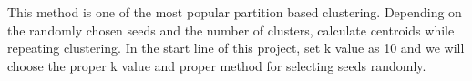 This method is one of the most popular partition based clustering. Depending on the randomly chosen seeds and the number of clusters, calculate centroids while repeating clustering. In the start line of this project, set k value as 10 and we will choose the proper k value and proper method for selecting seeds randomly. 